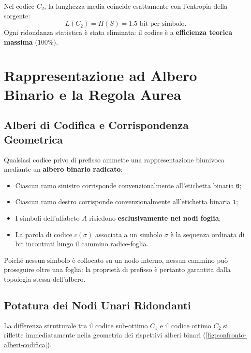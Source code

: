 Nel codice $C_2$, la lunghezza media coincide esattamente con l'entropia della sorgente:
\begin{equation}
  L(C_2) = H(S) = 1.5 \text{ bit per simbolo}.
\end{equation}
Ogni ridondanza statistica \`e stata eliminata: il codice \`e a \textbf{efficienza teorica massima} ($100\%$).

\FloatBarrier
\section{Rappresentazione ad Albero Binario e la Regola Aurea}
\label{sec:albero-binario-regola-aurea}

\FloatBarrier
\subsection{Alberi di Codifica e Corrispondenza Geometrica}
\label{subsec:alberi-codifica}

Qualsiasi codice privo di prefisso ammette una rappresentazione biunivoca mediante un \textbf{albero binario radicato}:
\begin{itemize}
  \item Ciascun ramo sinistro corrisponde convenzionalmente all'etichetta binaria \texttt{0};
  \item Ciascun ramo destro corrisponde convenzionalmente all'etichetta binaria \texttt{1};
  \item I simboli dell'alfabeto $A$ risiedono \textbf{esclusivamente nei nodi foglia};
  \item La parola di codice $c(\sigma)$ associata a un simbolo $\sigma$ \`e la sequenza ordinata di bit incontrati lungo il cammino radice-foglia.
\end{itemize}

Poich\'e nessun simbolo \`e collocato su un nodo interno, nessun cammino pu\`o proseguire oltre una foglia: la propriet\`a di prefisso \`e pertanto garantita dalla topologia stessa dell'albero.

\FloatBarrier
\subsection{Potatura dei Nodi Unari Ridondanti}
\label{subsec:potatura-nodi-unari}

La differenza strutturale tra il codice sub-ottimo $C_1$ e il codice ottimo $C_2$ si riflette immediatamente nella geometria dei rispettivi alberi binari (\autoref{fig:confronto-alberi-codifica}).

